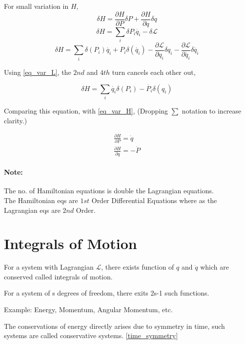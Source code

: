 \documentclass[a4paper]{article}
\newcommand{\Lagr}{\mathcal{L}}
\newcommand{\pdt}[2]{\frac{\partial #1}{\partial #2}}
\begin{document}
		For small variation in $H$,
		\begin{equation}
			\delta H = \pdt{H}{P} \delta P + \pdt{H}{q}\delta q \label{eq_var_H}
		\end{equation}
		$$ \delta H = \sum_i \delta P_i\dot{q_i} - \delta \Lagr $$
		$$ \delta H = \sum_i \delta(P_i) \dot{q_i} + P_i\delta(\dot{q_i}) - \pdt{\Lagr}{q_i}\delta q_i - \pdt{\Lagr}{\dot{q_i}}\delta \dot{q_i} $$

		Using \eqref{eq_var_L}, the $2nd$ and $4th$ turn cancels each other out, 

		$$ \delta H = \sum_i \dot{q_i} \delta(P_i) - \dot{P_i} \delta(q_i) $$

		Comparing this equation, with \eqref{eq_var_H}, ({Dropping $\sum$ notation to increase clarity.})

		\begin{eqnarray}
			\pdt{H}{P} = \dot{q} \\
			\pdt{H}{q} = -\dot{P}
		\end{eqnarray}

		\paragraph*{Note:}
			The no. of Hamiltonian equations is double the Lagrangian equations. \\
			The Hamiltonian eqs are $1st$ Order Differential Equations where as the Lagrangian eqs are $2nd$ Order.
	
	\section*{Integrals of Motion}
		
		For a system with Lagrangian $\Lagr$, there exists function of $q$ and $\dot{q}$ which are conserved called integrals of motion.

		For a system of s degrees of freedom, there exits 2s-1 such functions.

		Example: Energy, Momentum, Angular Momentum, etc.

		The conservations of energy directly arises due to symmetry in time, such systems are called conservative systems. \autoref{time_symmetry}
\end{document}
